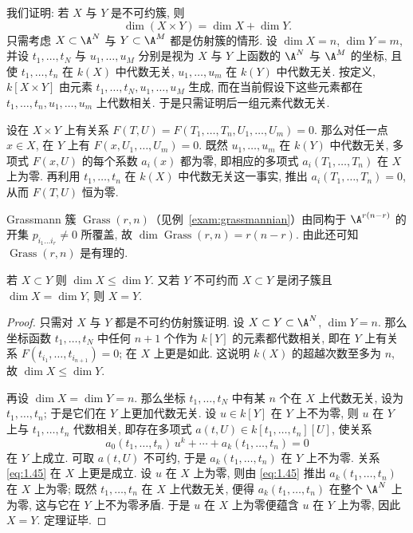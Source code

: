 \begin{example}\label{exam:dim-product}
	我们证明: 若 $X$ 与 $Y$ 是不可约簇, 则
	\[
		\dim(X \times Y) = \dim X + \dim Y.
	\]
	只需考虑 $X \subset \A^N$ 与 $Y \subset \A^M$ 都是仿射簇的情形. 设 $\dim X = n$, $\dim Y = m$, 并设 $t_1, \ldots, t_N$ 与 $u_1, \ldots, u_M$ 分别是视为 $X$ 与 $Y$ 上函数的 $\A^N$ 与 $\A^M$ 的坐标, 且使 $t_1, \ldots, t_n$ 在 $k(X)$ 中代数无关, $u_1, \ldots, u_m$ 在 $k(Y)$ 中代数无关. 按定义, $k[X \times Y]$ 由元素 $t_1, \ldots, t_N, u_1, \ldots, u_M$ 生成, 而在当前假设下这些元素都在 $t_1, \ldots, t_n, u_1, \ldots, u_m$ 上代数相关. 于是只需证明后一组元素代数无关.

	设在 $X \times Y$ 上有关系 $F(T, U) = F(T_1, \ldots, T_n, U_1, \ldots, U_m) = 0$. 那么对任一点 $x \in X$, 在 $Y$ 上有 $F(x, U_1, \ldots, U_m) = 0$. 既然 $u_1, \ldots, u_m$ 在 $k(Y)$ 中代数无关, 多项式 $F(x, U)$ 的每个系数 $a_i(x)$ 都为零, 即相应的多项式 $a_i(T_1, \ldots, T_n)$ 在 $X$ 上为零. 再利用 $t_1, \ldots, t_n$ 在 $k(X)$ 中代数无关这一事实, 推出 $a_i(T_1, \ldots, T_n) = 0$, 从而 $F(T, U)$ 恒为零.
\end{example}

\begin{example}\label{exam:dim-grassmann}
	Grassmann 簇 $\operatorname{Grass}(r, n)$（见例~\ref{exam:grassmannian}）由同构于 $\A^{r(n-r)}$ 的开集 $p_{i_1 \ldots i_r} \ne 0$ 所覆盖, 故 $\dim \operatorname{Grass}(r, n) = r(n-r)$. 由此还可知 $\operatorname{Grass}(r, n)$ 是有理的.
\end{example}

\begin{theorem}\label{thm:dim-monotone}
	若 $X \subset Y$ 则 $\dim X \le \dim Y$. 又若 $Y$ 不可约而 $X \subset Y$ 是闭子簇且 $\dim X = \dim Y$, 则 $X = Y$.
\end{theorem}

\begin{proof}
	只需对 $X$ 与 $Y$ 都是不可约仿射簇证明. 设 $X \subset Y \subset \A^N$, $\dim Y = n$. 那么坐标函数 $t_1, \ldots, t_N$ 中任何 $n+1$ 个作为 $k[Y]$ 的元素都代数相关, 即在 $Y$ 上有关系 $F(t_{i_1}, \ldots, t_{i_{n+1}}) = 0$; 在 $X$ 上更是如此. 这说明 $k(X)$ 的超越次数至多为 $n$, 故 $\dim X \le \dim Y$.

	再设 $\dim X = \dim Y = n$. 那么坐标 $t_1, \ldots, t_N$ 中有某 $n$ 个在 $X$ 上代数无关, 设为 $t_1, \ldots, t_n$; 于是它们在 $Y$ 上更加代数无关. 设 $u \in k[Y]$ 在 $Y$ 上不为零, 则 $u$ 在 $Y$ 上与 $t_1, \ldots, t_n$ 代数相关, 即存在多项式 $a(t, U) \in k[t_1, \ldots, t_n][U]$, 使关系
	\begin{equation}
		\label{eq:1.45}
		a_0(t_1, \ldots, t_n)\, u^k + \cdots + a_k(t_1, \ldots, t_n) = 0
	\end{equation}
	在 $Y$ 上成立. 可取 $a(t, U)$ 不可约, 于是 $a_k(t_1, \ldots, t_n)$ 在 $Y$ 上不为零. 关系 \eqref{eq:1.45} 在 $X$ 上更是成立. 设 $u$ 在 $X$ 上为零, 则由 \eqref{eq:1.45} 推出 $a_k(t_1, \ldots, t_n)$ 在 $X$ 上为零; 既然 $t_1, \ldots, t_n$ 在 $X$ 上代数无关, 便得 $a_k(t_1, \ldots, t_n)$ 在整个 $\A^N$ 上为零, 这与它在 $Y$ 上不为零矛盾. 于是 $u$ 在 $X$ 上为零便蕴含 $u$ 在 $Y$ 上为零, 因此 $X = Y$. 定理证毕.
\end{proof}

